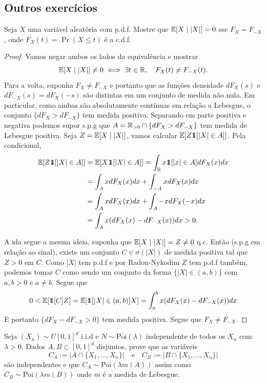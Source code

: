 \subsection{Outros exercícios}

\begin{exercise} [4]
	Seja $X$ uma variável aleatória com p.d.f. Mostre que $\mathbb{E}[X \mid
	|X|] = 0$ sse $F_X = F_{-X}$, onde
	$F_X(t) = \Pr(X \leq t)$ é a c.d.f.
\end{exercise}
\begin{proof}
	Vamos negar ambos os lados da equivalência e mostrar
	\[
		\mathbb{E}[X \mid |X|] \neq 0 \iff \exists t \in \mathbb{R}, \quad F_X(t) \neq F_{-X}(t).
	\]
	Para a volta, suponha $F_X \neq F_{-X}$ e portanto que as funções
	densidade $dF_X(s)$ e $dF_{-X}(s) = dF_{X}(-s)$ são distintas em um
	conjunto de medida não nula.
	Em particular, como ambas são absolutamente contínuas em relação a
	Lebesgue, o conjunto $\{dF_X > dF_{-X}\}$ tem medida positiva.
	Separando em parte positiva e negativa
	podemos supor s.p.g que $A = \mathbb{R}_{>0} \cap \{dF_X > dF_{-X}\}$ tem
	medida de Lebesgue positiva. Seja $Z = \mathbb{E}[X \mid |X|]$, vamos calcular
	$\mathbb{E}[Z\hbox{$1\mkern-6.5mu1$}[|X| \in A]]$. Pela condicional,
	\begin{align*}		
		\mathbb{E}[Z\hbox{$1\mkern-6.5mu1$}[|X| \in A]] &= \mathbb{E}[X \hbox{$1\mkern-6.5mu1$}[|X| \in A]] = \int_{\mathbb{R}} x \hbox{$1\mkern-6.5mu1$}[|x|
		\in A] dF_X(x) dx\\
		&= \int_{A} x dF_X(x) dx + \int_{-A} x dF_X(x) dx \\
		&= \int_{A} x dF_X(x) dx + \int_{A} -x dF_X(-x) dx\\
		&= \int_{A} x (dF_X(x) - dF_{-X}(x)) dx > 0.
	\end{align*}

	A ida segue a mesma ideia, suponha que $\mathbb{E}[X \mid |X|] = Z \neq 0$
	q.c. Então (s.p.g em relação ao sinal), existe um conjunto $C \in
	\sigma(|X|)$ de medida positiva
	tal que $Z > 0$ em $C$. Como $|X|$ tem p.d.f e por Radon-Nykodim $Z$
	tem p.d.f também, podemos tomar $C$ como sendo um conjunto da forma
	$\{|X| \in (a,b)\}$ com $a,b > 0$ e $a \neq b$.
	Segue que
	\[
		0 < \mathbb{E}[\hbox{$1\mkern-6.5mu1$}[C] Z] = \mathbb{E}[\hbox{$1\mkern-6.5mu1$}[|X| \in (a,b)] X] = \int_a^b x(dF_X(x)
		- dF_{-X}(x)) dx
	\]
	E portanto $\{dF_X - dF_{-X} > 0\}$ tem medida positiva. Segue que
	$F_X \neq F_{-X}$.
\end{proof}

\begin{exercise} [7]
	Seja $(X_n) \sim U[0,1]^d$ i.i.d e $N \sim \text{Poi}(\lambda)$
	independente de todos os $X_n$ com $\lambda > 0$. Dados $A,B \subset
	[0,1]^d$ disjuntos,
	prove que as variáveis
	\[
		C_A := |A \cap \{X_1, \dots, X_n\}| \quad \text{e} \quad C_B := |B
		\cap \{X_1, \dots, X_n\}|
	\]
	são independentes e que $C_A \sim \text{Poi}(\lambda m(A))$ assim
	como $C_B \sim \text{Poi}(\lambda m(B))$ onde $m$ é a medida de Lebesgue.
\end{exercise}

